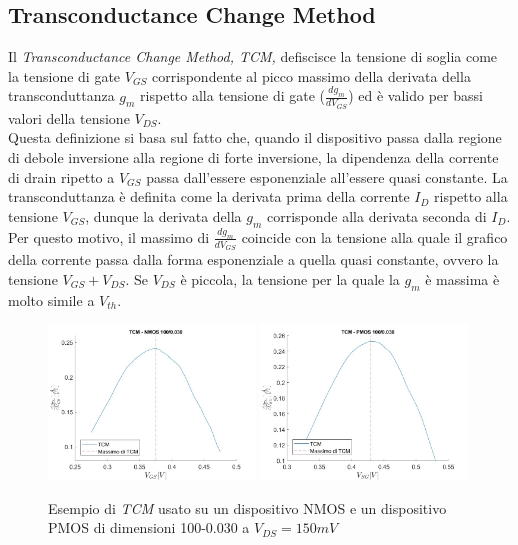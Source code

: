 \documentclass[
	a4paper,
	cleardoublepage=empty,
	headings=twolinechapter,
	numbers=autoenddot,
]{scrbook}
\begin{document}
\subsection{Transconductance Change Method}
Il \emph{Transconductance Change Method, TCM,} defiscisce la tensione di soglia come la tensione di gate $V_{GS}$ corrispondente al picco massimo della derivata della transconduttanza $g_m$ rispetto alla tensione di gate ($\frac{dg_m}{dV_ {GS}}$) ed è valido per bassi valori della tensione $V_{DS}$.\\
Questa definizione si basa sul fatto che, quando il dispositivo passa dalla regione di debole inversione alla regione di forte inversione, la dipendenza della corrente di drain ripetto a $V_{GS}$ passa dall'essere esponenziale all'essere quasi constante.
La transconduttanza è definita come la derivata prima della corrente $I_D$ rispetto alla tensione $V_{GS}$, dunque la derivata della $g_m$ corrisponde alla derivata seconda di $I_D$. Per questo motivo, il massimo di $\frac{dg_m}{dV_{GS}}$ coincide con la tensione alla quale il grafico della corrente passa dalla forma esponenziale a quella quasi constante, ovvero la tensione $V_{GS}+V_{DS}$. Se $V_{DS}$ è piccola, la tensione per la quale la $g_m$ è massima è molto simile a $V_{th}$.

\begin{figure}[h!]
  \centering
  \includegraphics[width=0.49\textwidth]{TCM-N4-100-30-NoFit}
  \includegraphics[width=0.49\textwidth]{TCM-P1-100-30-NoFit}
  \caption{Esempio di \emph{TCM} usato su un dispositivo NMOS e un dispositivo PMOS di dimensioni 100-0.030 a $V_{DS} = 150 mV$}
\end{figure}
\end{document}
